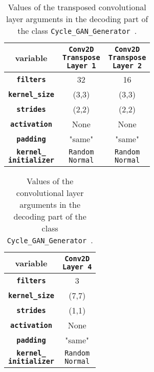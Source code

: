 \documentclass[fleqn,10pt]{SelfArx} %
\begin{document}
\begin{table}[htb]
\centering
\caption{Values of the transposed convolutional layer arguments in the decoding part of the class \texttt{Cycle\_GAN\-\_Gene\-rator}~\cite{image-to-image-ccan}.}
\label{tab:decoderValues1}
\begin{tabular}{c c c}
\textbf{variable} & \makecell[cc]{\textbf{\texttt{Conv2D}} \\ \textbf{\texttt{Transpose}} \\ \textbf{\texttt{Layer 1}}} & \makecell[cc]{\textbf{\texttt{Conv2D}} \\ \textbf{\texttt{Transpose}} \\ \textbf{\texttt{Layer 2}}} \\ \hline
\textbf{\texttt{filters}} & 32 & 16 \\ \hline
\textbf{\texttt{kernel\_size}} & (3,3) & (3,3)  \\ \hline
\textbf{\texttt{strides}} & (2,2) & (2,2)  \\ \hline
\textbf{\texttt{activation}} & None & None  \\ \hline 
\textbf{\texttt{padding}} & "same" & "same" \\ \hline
\makecell[cc]{\textbf{\texttt{kernel\_}} \\ \textbf{\texttt{initializer}}} & \makecell[cc]{\texttt{Random} \\ \texttt{Normal}} & \makecell[cc]{\texttt{Random} \\ \texttt{Normal}}  \\ \hline
\end{tabular}
\end{table}

\begin{table}[htb]
\centering
\caption{Values of the convolutional layer arguments in the decoding part of the class \texttt{Cycle\_GAN\-\_Gene\-rator}~\cite{image-to-image-ccan}.}
\label{tab:decoderValues2}
\begin{tabular}{c c}
\textbf{variable} & \makecell[cc]{\textbf{\texttt{Conv2D}} \\ \textbf{\texttt{Layer 4}}} \\ \hline
\textbf{\texttt{filters}} & 3 \\ \hline
\textbf{\texttt{kernel\_size}} & (7,7) \\ \hline
\textbf{\texttt{strides}} & (1,1) \\ \hline
\textbf{\texttt{activation}} & None \\ \hline 
\textbf{\texttt{padding}} & "same" \\ \hline
\makecell[cc]{\textbf{\texttt{kernel\_}} \\ \textbf{\texttt{initializer}}} & \makecell[cc]{\texttt{Random} \\ \texttt{Normal}} \\ \hline
\end{tabular}
\end{table}
\end{document}
